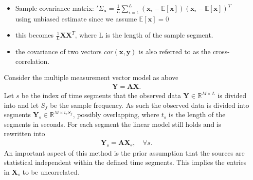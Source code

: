 {\begin{itemize}
\item Sample covariance matrix: $'\Sigma_{\textbf{x}} = \frac{1}{L} \sum_{i=1}^{L}(\textbf{x}_i-\mathbb{E}[\textbf{x}])(\textbf{x}_i-\mathbb{E}[\textbf{x}])^T$ using unbiased estimate since we assume $\mathbb{E}[\textbf{x}]=0$
\item this becomes $\frac{1}{L}\textbf{X}\textbf{X}^T$, where L is the length of the sample segment.  
\item the covariance of two vectors $cor(\textbf{x},\textbf{y})$ is also referred to as the cross-correlation.
\end{itemize}
}

Consider the multiple measurement vector model as above
\begin{align*}
\mathbf{Y} = \mathbf{AX}.
\end{align*}
Let $s$ be the index of time segments that the observed data $\mathbf{Y}\in \mathbb{R}^{M\times L}$ is divided into and let $S_f$ be the sample frequency. As such the observed data is divided into segments $\mathbf{Y}_s \in \mathbb{R}^{M \times t_s S_f}$, possibly overlapping, where $t_s$ is the length of the segments in seconds. For each segment the linear model still holds and is rewritten into
\begin{align*}
\mathbf{Y}_s = \mathbf{AX}_s, \quad \forall s.
\end{align*}
An important aspect of this method is the prior assumption that the sources are statistical independent within the defined time segments. This implies the entries in $\textbf{X}_s$ to be uncorrelated. 

